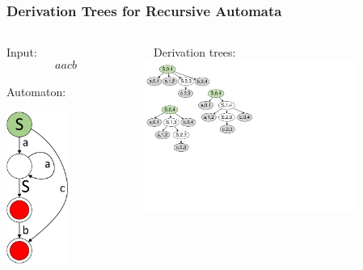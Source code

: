 \documentclass{beamer}
\begin{document}
	\begin{frame} 
		\frametitle{Derivation Trees for Recursive Automata}
		\begin{columns}
			\begin{column}{3.7cm}
				Input: $$aacb$$ \\
				\vspace{10pt}
				Automaton: \\
				\vspace{5pt}
				\begin{center}
					\includegraphics[width=2cm]{pictures/G0minimizedAutomaton.pdf}
				\end{center}
			\end{column}
		
     		\begin{column}{6cm}
     			\ \ Derivation trees:\\
     			\vspace{5pt}
     			\includegraphics[width=7cm]{pictures/G0trees.pdf}
			\end{column}
		
		\end{columns}

	\end{frame}
	
\end{document}
